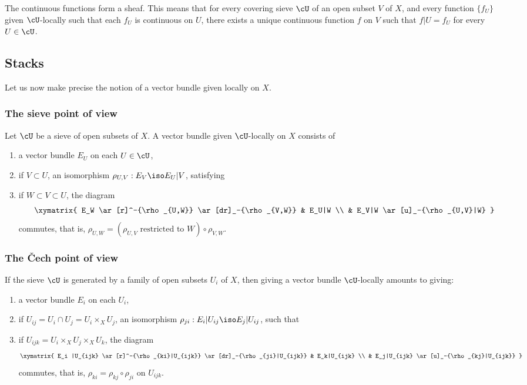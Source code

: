 \subsubsection{}\label{I:1-2-3}

The continuous functions form a sheaf. This means that for every covering
sieve $\cU$ of an open subset $V$ of $X$, and every function
$\{f_U\}$ given $\cU$-locally such that each $f_U$ is continuous on
$U$, there exists a unique continuous function $f$ on $V$ such that
$f|U=f_U$ for every $U\in \cU$.

\subsection{Stacks}\label{I:1-3}

Let us now make precise the notion of a vector bundle given locally on $X$.

\subsubsection{The sieve point of view}\label{I:1-3-1}

Let $\cU$ be a sieve of open subsets of $X$. A vector bundle given
$\cU$-locally on $X$ consists of
\begin{enumerate}[\indent a)]
  \item {}a vector bundle $E_U$ on each $U\in \cU$,
  \item if $V\subset U$, an isomorphism
    $\rho_{U,V}:E_V\iso E_U|V$, satisfying
  \item if $W\subset V\subset U$, the diagram
    \[\xymatrix{
      E_W \ar[r]^-{\rho_{U,W}} \ar[dr]_-{\rho_{V,W}}
        & E_U|W \\
      & E_V|W \ar[u]_-{\rho_{U,V}|W}
    }\]
    commutes, that is,
    $\rho_{U,W} = (\mbox{$\rho_{U,V}$ restricted to $W$}) \circ \rho_{V,W}$.
\end{enumerate}

\subsubsection{The Čech point of view}\label{I:1-3-2}

If the sieve $\cU$ is generated by a family of open subsets $U_i$ of
$X$, then giving a vector bundle $\cU$-locally amounts to giving:
\begin{enumerate}[\indent a)]
  \item a vector bundle $E_i$ on each $U_i$,
  \item if $U_{ij}=U_i\cap U_j=U_i\times_X U_j$, an isomorphism
    $\rho_{ji}:E_i|U_{ij}\iso E_j|U_{ij}$, such that
  \item if $U_{ijk}=U_i\times_X U_j\times_X U_k$, the diagram
    \[\xymatrix{
      E_i |U_{ijk} \ar[r]^-{\rho_{ki}|U_{ijk}} \ar[dr]_-{\rho_{ji}|U_{ijk}}
        & E_k|U_{ijk} \\
      & E_j|U_{ijk} \ar[u]_-{\rho_{kj}|U_{ijk}}
    }\]
    commutes, that is, $\rho_{ki}=\rho_{kj}\circ\rho_{ji}$ on
    $U_{ijk}$.
\end{enumerate}

